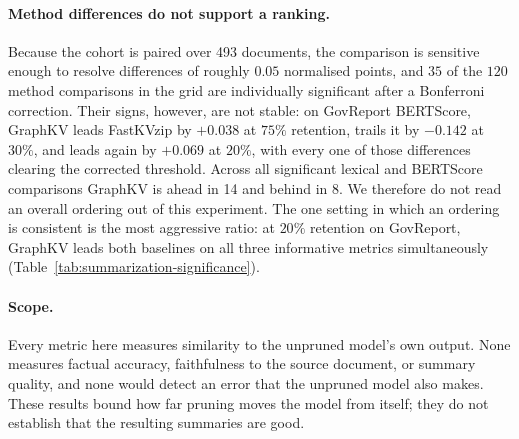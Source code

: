 \paragraph{Method differences do not support a ranking.} Because the cohort is paired over 493
documents, the comparison is sensitive enough to resolve differences of roughly $0.05$ normalised
points, and $35$ of the $120$ method comparisons in the grid are individually significant
after a Bonferroni correction. Their signs, however, are not stable: on GovReport BERTScore, GraphKV
leads FastKVzip by $+0.038$ at $75\%$ retention, trails it by $-0.142$ at $30\%$, and leads again by
$+0.069$ at $20\%$, with every one of those differences clearing the corrected threshold. Across all
significant lexical and BERTScore comparisons GraphKV is ahead in 14 and behind in 8. We therefore
do not read an overall ordering out of this experiment. The one setting in which an ordering is
consistent is the most aggressive ratio: at $20\%$ retention on GovReport, GraphKV leads both
baselines on all three informative metrics simultaneously
(Table~\ref{tab:summarization-significance}).

\paragraph{Scope.} Every metric here measures similarity to the unpruned model's own output. None
measures factual accuracy, faithfulness to the source document, or summary quality, and none would
detect an error that the unpruned model also makes. These results bound how far pruning moves the
model from itself; they do not establish that the resulting summaries are good.

